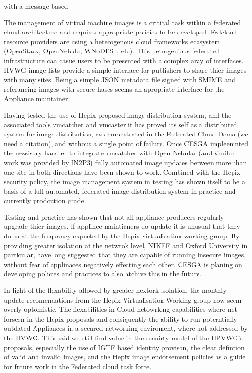 \documentclass{llncs_Ibergrid2013}
\begin{document}
with a message based 

The management of virtual machine images is a critical task within a federated cloud architecture and requires appropriate policies to be developed. Fedcloud resource providers are using a heterogenous cloud frameworks ecosystem (OpenStack, OpenNebula, WNoDES~\cite{wnodes}, etc). This hetrogenious federated infrastructure can casue users to be presented with a complex aray of interfaces. HVWG image lists provide a simple interface for publishers to share thier images with many sites. Being a simple JSON metadata file signed with SMIME and referancing images with secure hases seems an apropriate interface for the Appliance maintainer.

Having tested the use of Hepix proposed image distribution system, and the associated tools vmcatcher and vmcaster it has proved its self as a distributed system for image distribution, as demonstrated in the Federated Cloud Demo (we need a citation), and without a single point of failure. Once CESGA impleemnted the nessisary handler to integrate vmcatcher with Open Nebular (and similar work was provided by IN2P3) fully automated image updates between more than one site in both directions have been shown to work. Combined with the Hepix security policy, the image management system in testing has shown itself to be a basis of a full automated, federated image distribution system in practice and currently prodcution grade.

Testing and practice has shown that not all appliance producers regularly upgrade thier images. If applince maintianers do update it is unusual that they do so at the frequancy expected by the Hepix virtualisation working group. By providing greater isolation at the netwrok level, NIKEF and Oxford University in particular, have long suggested that they are capable of running insecure images, without fear of applinaces negatively effecting each other. CESGA is planing on developing policies and practices to also atchive this in the future. 

In light of the flexability allowed by greater nextork isolation, the monthly update recomendations from the Hepix Virtualisation Working group now seem overly optomistic. The flexabilities in Cloud netowrking capabilities where not forseen in the Hepix proposals and consiquently the ability to run poterntially outdated Appliances in a secured networking enviroment, where not addressed by the HVWG. This said we still find value in the secuirty model of the HPVWG's proposals, especially the use of IGTF based identity provison, the clear defintion of valid and invalid images, and the Hepix image endorsement policies as a guide for future work in the Federated cloud task force.
\end{document}
